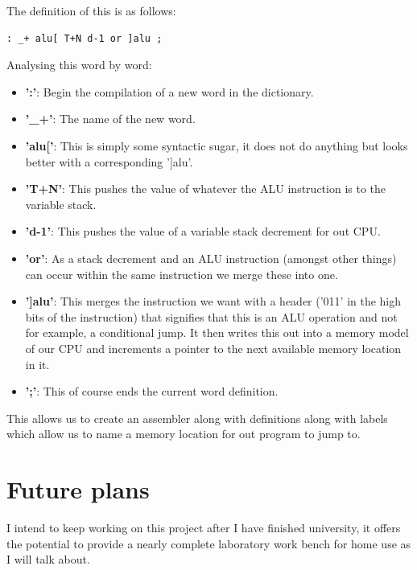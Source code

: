 \documentclass	[a4paper, 10pt]	{article}
\begin{document}
    The definition of this is as follows:    

\begin{verbatim}
: _+ alu[ T+N d-1 or ]alu ;
\end{verbatim}

    Analysing this word by word:

    \begin{itemize}
      \item \textbf{':'}: Begin the compilation of a new word in the dictionary.
      \item \textbf{'\_+'}: The name of the new word.
      \item \textbf{'alu['}: This is simply some syntactic sugar, it does not
      do anything but looks better with a corresponding ']alu'.
      \item \textbf{'T+N'}: This pushes the value of whatever the ALU instruction
      is to the variable stack.
      \item \textbf{'d-1'}: This pushes the value of a variable stack decrement
      for out CPU.
      \item \textbf{'or'}: As a stack decrement and an ALU instruction (amongst
      other things) can occur within the same instruction we merge these into
      one.
      \item \textbf{']alu'}: This merges the instruction we want with a header
      ('011' in the high bits of the instruction) that signifies that this is
      an ALU operation and not for example, a conditional jump. It then writes
      this out into a memory model of our CPU and increments a pointer to the
      next available memory location in it.
      \item \textbf{';'}: This of course ends the current word definition.
    \end{itemize}

    This allows us to create an assembler along with definitions along with labels
    which allow us to name a memory location for out program to jump to.

   \section{Future plans}
    \label{sec:futurePlans}

    I intend to keep working on this project after I have finished university, it offers the
    potential to provide a nearly complete laboratory work bench for home use as I will talk
    about.
\end{document}
